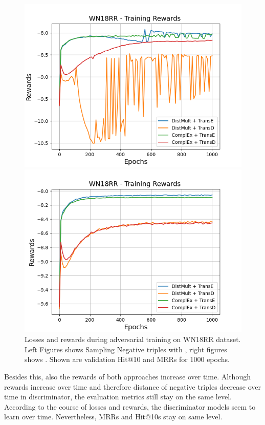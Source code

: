 \begin{figure}
    \begin{minipage}{.5\textwidth}
      \centering
      \includegraphics[width=0.9\linewidth]{figures/results/gan_train/not_pretrained/uncertainty/max/entropy/wn18rr/1k_epochs/uncertainty_wn18rr_rew.png}
    \end{minipage}%
    \begin{minipage}{.5\textwidth}
      \centering
      \includegraphics[width=0.9\linewidth]{figures/results/gan_train/not_pretrained/uncertainty/max_distribution/entropy/wn18rr/1k_epochs/uncertainty_wn18rr_rew.png}
    \end{minipage}%
    \caption{Losses and rewards during adversarial training on \textsc{WN18RR} dataset. 
    Left Figures shows Sampling Negative triples with \usmax, right figures shows \ussoftmax.
    Shown are validation Hit@10 and MRRs for 1000 epochs.}
    \label{fig:advtrain_wn18rr_usmax_ussoftmax_losses_rewards}
\end{figure}
Besides this, also the rewards of both approaches increase over time.
Although rewards increase over time and therefore distance of negative triples decrease over time in discriminator, the evaluation metrics still stay on the same level.
According to the course of losses and rewards, the discriminator models seem to learn over time.
Nevertheless, MRRs and Hit@10s stay on same level.
